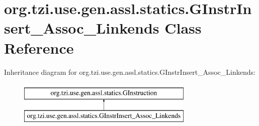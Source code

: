\hypertarget{classorg_1_1tzi_1_1use_1_1gen_1_1assl_1_1statics_1_1_g_instr_insert___assoc___linkends}{\section{org.\-tzi.\-use.\-gen.\-assl.\-statics.\-G\-Instr\-Insert\-\_\-\-Assoc\-\_\-\-Linkends Class Reference}
\label{classorg_1_1tzi_1_1use_1_1gen_1_1assl_1_1statics_1_1_g_instr_insert___assoc___linkends}
}
Inheritance diagram for org.\-tzi.\-use.\-gen.\-assl.\-statics.\-G\-Instr\-Insert\-\_\-\-Assoc\-\_\-\-Linkends\-:\begin{figure}[H]
\begin{center}
\leavevmode
\includegraphics[height=2.000000cm]{classorg_1_1tzi_1_1use_1_1gen_1_1assl_1_1statics_1_1_g_instr_insert___assoc___linkends}
\end{center}
\end{figure}
